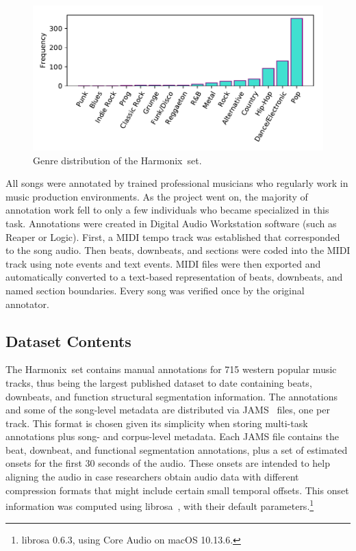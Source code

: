 \documentclass{article}
\newcommand{\setName}{Harmonix}
\begin{document}
\begin{figure}
    \centerline{\includegraphics[width=\columnwidth]{figs/PublishedGenres_distribution.pdf}}
    \caption{Genre distribution of the \setName~set.}
    \label{fig:genres_dist}
\end{figure}

All songs were annotated by trained professional musicians who regularly work in music production environments. As the project went on, the majority of annotation work fell to only a few individuals who became specialized in this task. Annotations were created in Digital Audio Workstation software (such as Reaper or Logic). First, a MIDI tempo track was established that corresponded to the song audio. Then beats, downbeats, and sections were coded into the MIDI track using note events and text events. MIDI files were then exported and automatically converted to a text-based representation of beats, downbeats, and named section boundaries. Every song was verified once by the original annotator.


\subsection{Dataset Contents}

The \setName~set contains manual annotations for 715 western popular music tracks, thus being the largest published  dataset to date containing beats, downbeats, and function structural segmentation information.
The annotations and some of the song-level metadata are distributed via JAMS~\cite{Humphrey2014} files, one per track.
This format is chosen given its simplicity when storing multi-task annotations plus song- and corpus-level metadata.
Each JAMS file contains the beat, downbeat, and functional segmentation annotations, plus a set of estimated onsets for the first 30 seconds of the audio.
These onsets are intended to help aligning the audio in case researchers obtain audio data with different compression formats that might include certain small temporal offsets.
This onset information was computed using librosa~\cite{Mcfee2015a}, with their default parameters.\footnote{librosa 0.6.3, using Core Audio on macOS 10.13.6.}
\end{document}
